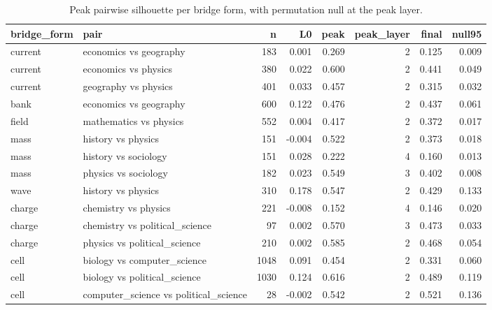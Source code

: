 \begin{table}
\caption{Peak pairwise silhouette per bridge form, with permutation null at the peak layer.}
\label{tab:silhouette_peak}
\begin{tabular}{llrrrrrr}
\toprule
bridge_form & pair & n & L0 & peak & peak_layer & final & null95 \\
\midrule
current & economics vs geography & 183 & 0.001 & 0.269 & 2 & 0.125 & 0.009 \\
current & economics vs physics & 380 & 0.022 & 0.600 & 2 & 0.441 & 0.049 \\
current & geography vs physics & 401 & 0.033 & 0.457 & 2 & 0.315 & 0.032 \\
bank & economics vs geography & 600 & 0.122 & 0.476 & 2 & 0.437 & 0.061 \\
field & mathematics vs physics & 552 & 0.004 & 0.417 & 2 & 0.372 & 0.017 \\
mass & history vs physics & 151 & -0.004 & 0.522 & 2 & 0.373 & 0.018 \\
mass & history vs sociology & 151 & 0.028 & 0.222 & 4 & 0.160 & 0.013 \\
mass & physics vs sociology & 182 & 0.023 & 0.549 & 3 & 0.402 & 0.008 \\
wave & history vs physics & 310 & 0.178 & 0.547 & 2 & 0.429 & 0.133 \\
charge & chemistry vs physics & 221 & -0.008 & 0.152 & 4 & 0.146 & 0.020 \\
charge & chemistry vs political_science & 97 & 0.002 & 0.570 & 3 & 0.473 & 0.033 \\
charge & physics vs political_science & 210 & 0.002 & 0.585 & 2 & 0.468 & 0.054 \\
cell & biology vs computer_science & 1048 & 0.091 & 0.454 & 2 & 0.331 & 0.060 \\
cell & biology vs political_science & 1030 & 0.124 & 0.616 & 2 & 0.489 & 0.119 \\
cell & computer_science vs political_science & 28 & -0.002 & 0.542 & 2 & 0.521 & 0.136 \\
\bottomrule
\end{tabular}
\end{table}
